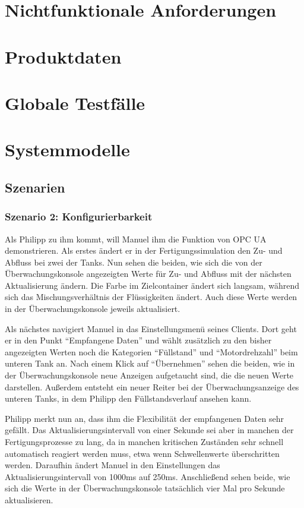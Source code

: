 \documentclass[parskip=full]{scrartcl}
\begin{document}
\section{Nichtfunktionale Anforderungen}
\Blindtext[1]

\section{Produktdaten}
\Blindtext[1]

\section{Globale Testfälle}
\Blindtext[1]

\section{Systemmodelle}
\subsection{Szenarien}
\subsubsection{Szenario 2: Konfigurierbarkeit}
Als Philipp zu ihm kommt, will Manuel ihm die Funktion von OPC UA demonstrieren.
Als erstes ändert er in der Fertigungssimulation den Zu- und Abfluss bei zwei der Tanks. Nun sehen die beiden, wie
sich die von der Überwachungskonsole angezeigten Werte für Zu- und Abfluss mit der nächsten Aktualisierung ändern. Die
Farbe im Zielcontainer ändert sich langsam, während sich das Mischungsverhältnis der Flüssigkeiten ändert. Auch diese
Werte werden in der Überwachungskonsole jeweils aktualisiert.

Als nächstes navigiert Manuel in das Einstellungsmenü seines Clients. Dort geht er in den Punkt ``Empfangene Daten'' und
wählt zusätzlich zu den bisher angezeigten Werten noch die Kategorien ``Füllstand'' und ``Motordrehzahl'' beim unteren Tank
an. Nach einem Klick auf ``Übernehmen'' sehen die beiden, wie in der Überwachungskonsole neue Anzeigen aufgetaucht sind,
die die neuen Werte darstellen. Außerdem entsteht ein neuer Reiter bei der Überwachungsanzeige des unteren Tanks,
in dem Philipp den Füllstandsverlauf ansehen kann.

Philipp merkt nun an, dass ihm die Flexibilität der empfangenen Daten sehr gefällt. Das Aktualisierungsintervall von
einer Sekunde sei aber in manchen der Fertigungsprozesse zu lang, da in manchen kritischen Zuständen sehr schnell
automatisch reagiert werden muss, etwa wenn Schwellenwerte überschritten werden. Daraufhin ändert Manuel in den
Einstellungen das Aktualisierungsintervall von 1000ms auf 250ms. Anschließend sehen beide, wie sich die Werte in der
Überwachungskonsole tatsächlich vier Mal pro Sekunde aktualisieren.
\end{document}

